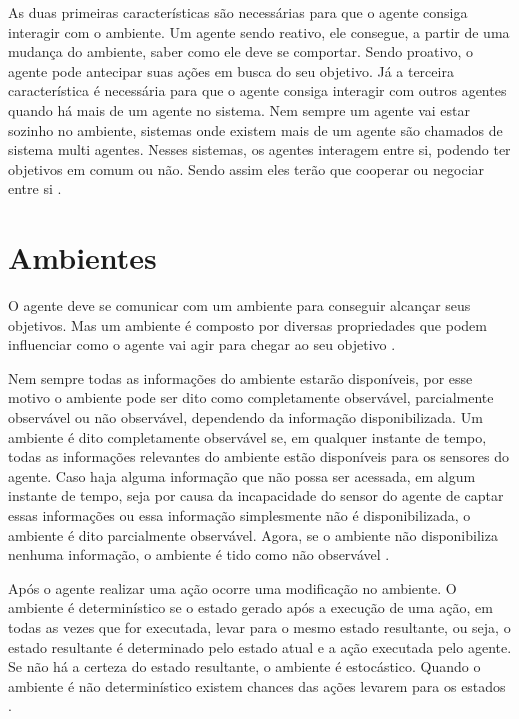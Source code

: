 As duas primeiras características são necessárias para que o agente consiga interagir com o ambiente. Um agente sendo reativo, ele consegue, a partir de uma mudança do ambiente, saber como ele deve se comportar. Sendo proativo, o agente pode antecipar suas ações em busca do seu objetivo.
Já a terceira característica é necessária para que o agente consiga interagir com outros agentes quando há mais de um agente no sistema. Nem sempre um agente vai estar sozinho no ambiente, sistemas onde existem mais de um agente são chamados de sistema multi agentes. Nesses sistemas, os agentes interagem entre si, podendo ter objetivos em comum ou não. Sendo assim eles terão que cooperar ou negociar entre si \cite{intelligence2003modern}.

\section{Ambientes}

O agente deve se comunicar com um ambiente para conseguir alcançar seus objetivos. Mas um ambiente é composto por diversas propriedades que podem influenciar como o agente vai agir para chegar ao seu objetivo \cite{intelligence2003modern}. 

Nem sempre todas as informações do ambiente estarão disponíveis, por esse motivo o ambiente pode ser dito como completamente observável, parcialmente observável ou não observável, dependendo da informação disponibilizada. Um ambiente é dito completamente observável se, em qualquer instante de tempo, todas as informações relevantes do ambiente estão disponíveis para os sensores do agente. Caso haja alguma informação que não possa ser acessada, em algum instante de tempo, seja por causa da incapacidade do sensor do agente de captar essas informações ou essa informação simplesmente não é disponibilizada, o ambiente é dito parcialmente observável. Agora, se o ambiente não disponibiliza nenhuma informação, o ambiente é tido como não observável \cite{ intelligence2003modern, agent1999}.   

Após o agente realizar uma ação ocorre uma modificação no ambiente. O ambiente é determinístico se o estado gerado após a execução de uma ação, em todas as vezes que for executada, levar para o mesmo estado resultante, ou seja, o estado resultante é determinado pelo estado atual e a ação executada pelo agente. Se não há a certeza do estado resultante, o ambiente é estocástico. Quando o ambiente é não determinístico existem chances das ações levarem para os estados \cite{intelligence2003modern}. 

